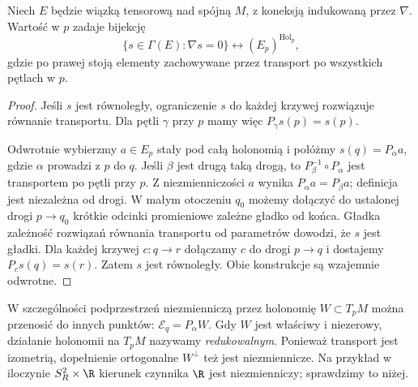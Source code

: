 \begin{stwierdzenie}
\label{prop:zasada-holonomii}
Niech $E$ będzie wiązką tensorową nad spójną $M$,
z koneksją indukowaną przez $\nabla$. Wartość w $p$
zadaje bijekcję
\[
 \{s\in\Gamma(E):\nabla s=0\}
 \longleftrightarrow (E_p)^{\operatorname{Hol}_p},
\]
gdzie po prawej stoją elementy zachowywane przez
transport po wszystkich pętlach w $p$.
\end{stwierdzenie}
\begin{proof}
Jeśli $s$ jest równoległy, ograniczenie $s$ do każdej
krzywej rozwiązuje równanie transportu. Dla pętli
$\gamma$ przy $p$ mamy więc $P_\gamma s(p)=s(p)$.

Odwrotnie wybierzmy $a\in E_p$ stały pod całą
holonomią i połóżmy $s(q)=P_\alpha a$, gdzie
$\alpha$ prowadzi z $p$ do $q$. Jeśli $\beta$ jest
drugą taką drogą, to $P_\beta^{-1}\circ P_\alpha$
jest transportem po pętli przy $p$. Z niezmienniczości
$a$ wynika $P_\alpha a=P_\beta a$; definicja jest
niezależna od drogi. W małym otoczeniu $q_0$ możemy
dołączyć do ustalonej drogi $p\to q_0$ krótkie odcinki
promieniowe zależne gładko od końca. Gładka zależność
rozwiązań równania transportu od parametrów dowodzi,
że $s$ jest gładki. Dla każdej krzywej $c:q\to r$
dołączamy $c$ do drogi $p\to q$ i dostajemy
$P_c s(q)=s(r)$. Zatem $s$ jest równoległy.
Obie konstrukcje są wzajemnie odwrotne.
\end{proof}

W szczególności podprzestrzeń niezmienniczą przez holonomię
$W\subset T_pM$ można przenosić do innych punktów:
$\mathcal E_q=P_\alpha W$. Gdy $W$ jest właściwy
i niezerowy, działanie holonomii na $T_pM$ nazywamy
\emph{redukowalnym}. Ponieważ transport jest izometrią,
dopełnienie ortogonalne $W^\perp$ też jest niezmiennicze.
Na przykład w iloczynie $S_R^2\times\R$ kierunek
czynnika $\R$ jest niezmienniczy; sprawdzimy to niżej.


